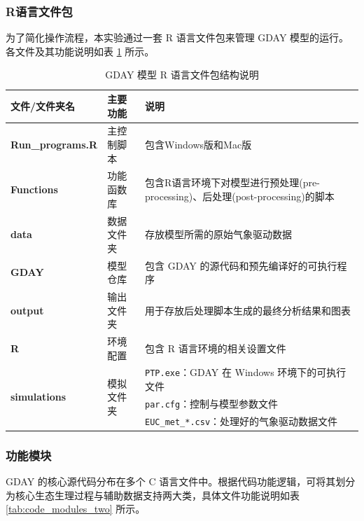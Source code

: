 \documentclass[10pt]{config}
\begin{document}
\subsubsection{R语言文件包}
为了简化操作流程，本实验通过一套 R 语言文件包来管理 GDAY 模型的运行。各文件及其功能说明如表 \ref{tab:r_package_structure} 所示。

\begin{table}[h]
    \centering
    \caption{GDAY 模型 R 语言文件包结构说明}
    \small
    \renewcommand{\arraystretch}{1.5} %
    \begin{tabular}{p{} p{} p{}}
        \toprule
        \textbf{文件/文件夹名} & \textbf{主要功能} & \textbf{说明} \\
        \midrule
        \textbf{Run\_programs.R} & 主控制脚本 & 包含Windows版和Mac版 \\
        \textbf{Functions} & 功能函数库 & 包含R语言环境下对模型进行预处理(pre-processing)、后处理(post-processing)的脚本 \\
        \textbf{data} & 数据文件夹 & 存放模型所需的原始气象驱动数据 \\
        \textbf{GDAY} & 模型仓库 & 包含 GDAY 的源代码和预先编译好的可执行程序 \\
        \textbf{output} & 输出文件夹 & 用于存放后处理脚本生成的最终分析结果和图表 \\
        \textbf{R} & 环境配置 & 包含 R 语言环境的相关设置文件 \\
        \midrule
        \multirow{3}{*}{\textbf{simulations}} & \multirow{3}{*}{模拟文件夹} & \texttt{PTP.exe}：GDAY 在 Windows 环境下的可执行文件 \\
         & & \texttt{par.cfg}：控制与模型参数文件 \\
         & & \texttt{EUC\_met\_*.csv}：处理好的气象驱动数据文件 \\
        \bottomrule
    \end{tabular}
    \label{tab:r_package_structure}
\end{table}



\subsubsection{功能模块}
GDAY 的核心源代码分布在多个 C 语言文件中。根据代码功能逻辑，可将其划分为核心生态生理过程与辅助数据支持两大类，具体文件功能说明如表 \ref{tab:code_modules_two} 所示。
\end{document}
